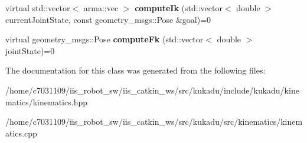 \begin{DoxyCompactItemize}
\item 
\hypertarget{classkukadu_1_1Kinematics_a5b143f7db7a84d7caa03419043426a5e}{virtual std\-::vector$<$ arma\-::vec $>$ {\bfseries compute\-Ik} (std\-::vector$<$ double $>$ current\-Joint\-State, const geometry\-\_\-msgs\-::\-Pose \&goal)=0}\label{classkukadu_1_1Kinematics_a5b143f7db7a84d7caa03419043426a5e}

\item 
\hypertarget{classkukadu_1_1Kinematics_aa80b36c16d23f6031f9b133ed72795f2}{virtual geometry\-\_\-msgs\-::\-Pose {\bfseries compute\-Fk} (std\-::vector$<$ double $>$ joint\-State)=0}\label{classkukadu_1_1Kinematics_aa80b36c16d23f6031f9b133ed72795f2}

\end{DoxyCompactItemize}


The documentation for this class was generated from the following files\-:\begin{DoxyCompactItemize}
\item 
/home/c7031109/iis\-\_\-robot\-\_\-sw/iis\-\_\-catkin\-\_\-ws/src/kukadu/include/kukadu/kinematics/kinematics.\-hpp\item 
/home/c7031109/iis\-\_\-robot\-\_\-sw/iis\-\_\-catkin\-\_\-ws/src/kukadu/src/kinematics/kinematics.\-cpp\end{DoxyCompactItemize}
